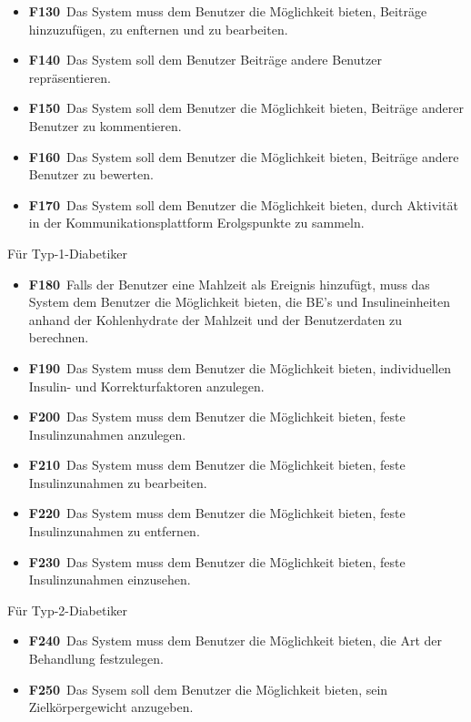 \documentclass[a4paper,11pt]{article}%
\renewcommand{\\}{\vspace*{0.5\baselineskip} \newline}
\begin{document}
\begin{itemize}
		\item \lbrack \textbf{F130}\rbrack \ Das System muss dem Benutzer die Möglichkeit bieten, Beiträge hinzuzufügen, zu enfternen und zu bearbeiten.
		\item \lbrack \textbf{F140}\rbrack \ Das System soll dem Benutzer Beiträge andere Benutzer repräsentieren.
		\item \lbrack \textbf{F150}\rbrack \ Das System soll dem Benutzer die Möglichkeit bieten, Beiträge anderer Benutzer zu kommentieren.
		\item \lbrack \textbf{F160}\rbrack \ Das System soll dem Benutzer die Möglichkeit bieten, Beiträge andere Benutzer zu bewerten.
		\item \lbrack \textbf{F170}\rbrack \ Das System soll dem Benutzer die Möglichkeit bieten, durch Aktivität in der Kommunikationsplattform Erolgspunkte zu sammeln.
	\end{itemize}
	Für Typ-1-Diabetiker
	\begin{itemize}
		\item \lbrack \textbf{F180}\rbrack \ Falls der Benutzer eine Mahlzeit als Ereignis hinzufügt, muss das System dem Benutzer die Möglichkeit bieten, die BE's und Insulineinheiten anhand der Kohlenhydrate der Mahlzeit und der Benutzerdaten zu berechnen.
		\item \lbrack \textbf{F190}\rbrack \ Das System muss dem Benutzer die Möglichkeit bieten, individuellen Insulin- und Korrekturfaktoren anzulegen.
		\item \lbrack \textbf{F200}\rbrack \ Das System muss dem Benutzer die Möglichkeit bieten, feste Insulinzunahmen anzulegen.
		\item \lbrack \textbf{F210}\rbrack \ Das System muss dem Benutzer die Möglichkeit bieten, feste Insulinzunahmen zu bearbeiten.
		\item \lbrack \textbf{F220}\rbrack \ Das System muss dem Benutzer die Möglichkeit bieten, feste Insulinzunahmen zu entfernen.
		\item \lbrack \textbf{F230}\rbrack \ Das System muss dem Benutzer die Möglichkeit bieten, feste Insulinzunahmen einzusehen.
	\end{itemize}
	Für Typ-2-Diabetiker
	\begin{itemize}
		\item \lbrack \textbf{F240}\rbrack \ Das System muss dem Benutzer die Möglichkeit bieten, die Art der Behandlung festzulegen.
		\item \lbrack \textbf{F250}\rbrack \ Das Sysem soll dem Benutzer die Möglichkeit bieten, sein Zielkörpergewicht anzugeben.
	\end{itemize}
\end{document}
